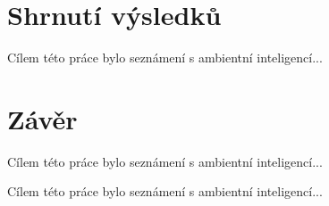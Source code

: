 
\chapter[Shrnutí výsledků]{Shrnutí výsledků}

Cílem této práce bylo seznámení s ambientní inteligencí... 

\chapter[Závěr]{Závěr}


Cílem této práce bylo seznámení s ambientní inteligencí... 

Cílem této práce bylo seznámení s ambientní inteligencí... 
